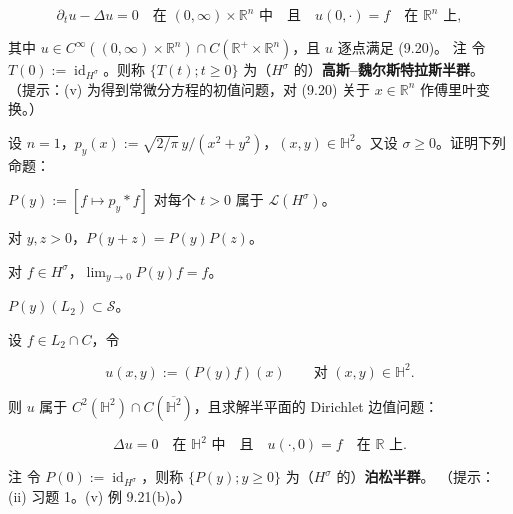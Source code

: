 \begin{exercises}
\begin{subitems}
\begin{equation}
\partial_t u - \Delta u = 0 \quad \text{在 } (0, \infty) \times \mathbb{R}^n \text{ 中} \quad \text{且} \quad u(0, \cdot) = f \quad \text{在 } \mathbb{R}^n \text{ 上},\tag{9.20}
\end{equation}

其中 $ u \in C^\infty((0, \infty) \times \mathbb{R}^n) \cap C(\mathbb{R}^+ \times \mathbb{R}^n) $，且 $ u $ 逐点满足 (9.20)。
注 令 $ T(0) := \operatorname{id}_{H^\sigma} $。则称 $ \{T(t) ; t \ge 0\} $ 为（$ H^\sigma $ 的）\textbf{高斯–魏尔斯特拉斯半群}。
（提示：(v) 为得到常微分方程的初值问题，对 (9.20) 关于 $ x \in \mathbb{R}^n $ 作傅里叶变换。）

\end{subitems}

\item

设 $ n = 1 $，$ p_y(x) := \sqrt{2/\pi}\, y/(x^2 + y^2) $，$ (x, y) \in \mathbb{H}^2 $。又设 $ \sigma \ge 0 $。证明下列命题：

\begin{subitems}
\item

$ P(y) := [f \mapsto p_y * f] $ 对每个 $ t > 0 $ 属于 $ \mathcal{L}(H^\sigma) $。

\item

对 $ y, z > 0 $，$ P(y + z) = P(y)P(z) $。

\item

对 $ f \in H^\sigma $，$ \lim_{y \to 0} P(y)f = f $。

\item

$ P(y)(L_2) \subset \mathcal{S} $。

\item

设 $ f \in L_2 \cap C $，令

\[
u(x, y) := (P(y)f)(x) \qquad \text{对 } (x, y) \in \mathbb{H}^2 .
\]

则 $ u $ 属于 $ C^2(\mathbb{H}^2) \cap C(\overline{\mathbb{H}^2}) $，且求解半平面的 Dirichlet 边值问题：

\[
\Delta u = 0 \quad \text{在 } \mathbb{H}^2 \text{ 中} \quad \text{且} \quad u(\cdot, 0) = f \quad \text{在 } \mathbb{R} \text{ 上} .
\]

注 令 $ P(0) := \operatorname{id}_{H^\sigma} $，则称 $ \{P(y) ; y \ge 0\} $ 为（$ H^\sigma $ 的）\textbf{泊松半群}。
（提示：(ii) 习题 1。(v) 例 9.21(b)。）


\end{subitems}
\end{exercises}
